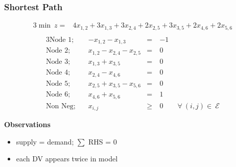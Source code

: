 \documentclass[10pt,handout,notes=show]{beamer}
\begin{document}
\begin{frame}
  \frametitle{Shortest Path  }

  \begin{flushleft} \small{
    \begin{alignat*}{3}
        \min\ z =   & 4x_{1,2} + 3x_{1,3}+  3x_{2,4} +  2x_{2,5} + 3x_{3,5} + 2x_{4,6} + 2x_{5,6} \\
      \end{alignat*}
      \begin{alignat*}{3}
        \mbox{Node 1;~~~}      & -x_{1,2} - x_{1,3}             &=\ &-1 \\
        \mbox{Node 2;~~~}      & x_{1,2} -  x_{2,4} -  x_{2,5}  &=\ &0 \\
        \mbox{Node 3;~~~}      & x_{1,3} + x_{3,5}              &=\ &0 \\
        \mbox{Node 4;~~~}      & x_{2,4} - x_{4,6}              &=\ &0 \\
        \mbox{Node 5;~~~}      & x_{2,5} + x_{3,5} - x_{5,6}    &=\ &0 \\
        \mbox{Node 6;~~~}      & x_{4,6} + x_{5,6}              &=\ &1 \\
        \mbox{Non Neg;~~~}     & x_{i,j} &\geq\ & 0 \qquad  \forall\ (i,j) \in\ \mathcal{E}
      \end{alignat*}
  }
  \end{flushleft}

  \textbf{Observations}
  \begin{itemize}
    \item supply = demand; $\sum$ RHS = 0
    \item each DV appears twice in model
  \end{itemize}

\end{frame}
\end{document}
